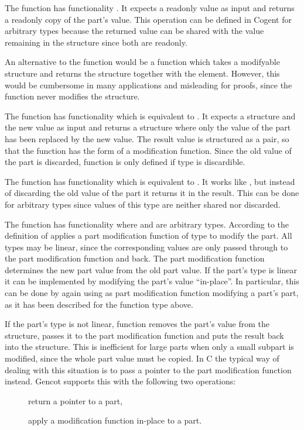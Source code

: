 The function  has functionality . It expects a readonly value as input and returns
a readonly copy of the part's value. This operation can be defined in Cogent for arbitrary types 
because the returned value can be shared with the value remaining in the structure since both are readonly.

An alternative to the function  would be a function which takes a modifyable structure and returns the structure
together with the element. However, this would be cumbersome in many applications and misleading for proofs, since 
the function never modifies the structure. 

The function  has functionality  which is equivalent to . 
It expects a structure and the new value as input
and returns a structure where only the value of the part has been replaced by the new value. The result value is 
structured as a pair, so that the function has the form of a modification function. Since the old
value of the part is discarded, function  is only defined if type  is discardible.

The function  has functionality  which is equivalent to . 
It works like , but instead of
discarding the old value of the part it returns it in the result. This can be done for arbitrary types 
since values of this type are neither shared nor discarded.

The function  has functionality  where  and  are
arbitrary types.
According to the definition of   applies a part modification function of
type  to modify the part. All types may be linear, since the corresponding values are
only passed through to the part modification function and back.
The part modification function determines the new part value from the old part value. If the part's type 
is linear it can be implemented by modifying the part's value ``in-place''. In particular, this can be done by
again using  as part modification function modifying a part's part, as it has been described
for the function type  above.

If the part's type  is not linear, function  removes the part's value from the structure,
passes it to the part modification function and puts the result back into the structure. This is
inefficient for large parts when only a small subpart is modified, since the whole part value must be copied.
In C the typical way of dealing with this situation is to pass a pointer to the part modification function 
instead. Gencot supports this with the following two operations:
\begin{description}
  \item[] return a pointer to a part,
  \item[] apply a modification function in-place to a part.
\end{description}

